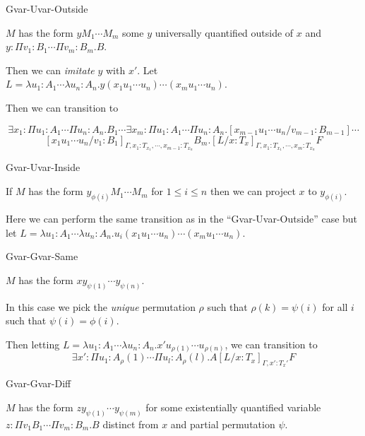 \begin{tcase}
Gvar-Uvar-Outside
\end{tcase}

$M$ has the form 
$y M_1 \cdots M_m$ some $y$ universally
quantified outside of $x$
and 
$y : \Pi v_1 : B_1 \cdots \Pi v_m : B_m . B$.  

Then we can \textit{imitate} $y$ with $x'$.
Let 
$L = \lambda u_1 : A_1 \cdots \lambda u_n : A_n .
 y (x_1 u_1 \cdots u_n) \cdots (x_m u_1 \cdots u_n)$.

Then we can transition to 

\[
\exists x_1 : \Pi u_1 : A_1 \cdots \Pi u_n : A_n . B_1 \cdots 
\exists x_m : \Pi u_1 : A_1 \cdots \Pi u_n : A_n . 
[x_{m-1}u_1\cdots u_n / v_{m-1} : B_{m-1}]
\cdots 
\]
\[
[x_1 u_1 \cdots u_n / v_1 : B_1]_{\Gamma, x_1:T_{x_1},\cdots, x_{m-1}:T_{x_n}} B_m .
[L / x : T_x ]_{\Gamma, x_1:T_{x_1},\cdots, x_m:T_{x_n}}F
\]

\begin{tcase}
Gvar-Uvar-Inside
\end{tcase}

If $M$ has the form 
$y_{\phi(i)} M_1 \cdots M_m$ for 
$1 \leq i \leq n$ then we can project $x$ to $y_{\phi(i)}$.

Here we can perform the same transition as in the ``Gvar-Uvar-Outside''
case but let 
$L = \lambda u_1 : A_1 \cdots \lambda u_n : A_n .
 u_i (x_1 u_1 \cdots u_n) \cdots (x_m u_1 \cdots u_n)$.

\begin{tcase}
Gvar-Gvar-Same
\end{tcase}

$M$ has the form 
$x y_{\psi(1)} \cdots y_{\psi(n)}$.

In this case we pick the \textit{unique} permutation $\rho$ 
such that $\rho(k) = \psi(i)$ for all $i$ such that $\psi(i) = \phi(i)$.

Then letting
$L = \lambda u_1 : A_1 \cdots \lambda u_n : A_n .
 x' u_{\rho(1)} \cdots u_{\rho(n)} $, 
we can transition to
\[
\exists x' : \Pi u_1 : A_\rho(1) \cdots \Pi u_l : A_\rho(l) . A 
[L / x : T_x ]_{\Gamma, x' : T_x'} F
\] 


\begin{tcase}
Gvar-Gvar-Diff
\end{tcase}


$M$ has the form $z y_{\psi(1)} \cdots y_{\psi(m)}$
for some existentially quantified variable $z : \Pi v_1 B_1 \cdots \Pi v_m : B_m . B$ 
distinct from $x$ and partial permutation $\psi$. 

